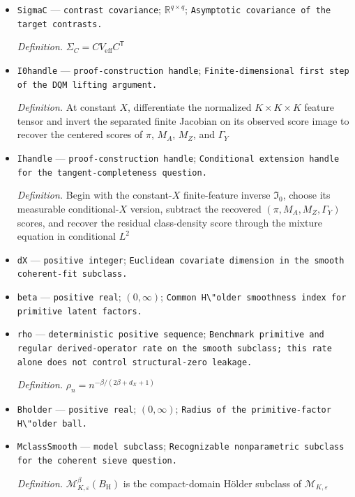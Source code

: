 \documentclass{article}
\begin{document}
\begin{itemize}
  \item \texttt{SigmaC} --- \texttt{contrast covariance}; \(\mathbb R^{q\times q}\); \texttt{Asymptotic covariance of the target contrasts.}
  \par\smallskip\noindent\emph{Definition.} \(\Sigma_C=CV_{\mathrm{eff}}C^{\mathsf T}\)
  \item \texttt{I0handle} --- \texttt{proof-\allowbreak{}construction handle}; \texttt{Finite-\allowbreak{}dimensional first step of the DQM lifting argument.}
  \par\smallskip\noindent\emph{Definition.} At constant \(X\), differentiate the normalized \(K\times K\times K\) feature tensor and invert the separated finite Jacobian on its observed score image to recover the centered scores of \(\pi\), \(M_A\), \(M_Z\), and \(\Gamma_Y\)
  \item \texttt{Ihandle} --- \texttt{proof-\allowbreak{}construction handle}; \texttt{Conditional extension handle for the tangent-\allowbreak{}completeness question.}
  \par\smallskip\noindent\emph{Definition.} Begin with the constant-\(X\) finite-feature inverse \(\mathfrak I_0\), choose its measurable conditional-\(X\) version, subtract the recovered \((\pi,M_A,M_Z,\Gamma_Y)\) scores, and recover the residual class-density score through the mixture equation in conditional \(L^{2}\)
  \item \texttt{dX} --- \texttt{positive integer}; \texttt{Euclidean covariate dimension in the smooth coherent-\allowbreak{}fit subclass.}
  \item \texttt{beta} --- \texttt{positive real}; \((0,\infty)\); \texttt{Common H\textbackslash{}\allowbreak{}"older smoothness index for primitive latent factors.}
  \item \texttt{rho} --- \texttt{deterministic positive sequence}; \texttt{Benchmark primitive and regular derived-\allowbreak{}operator rate on the smooth subclass;\allowbreak{} this rate alone does not control structural-\allowbreak{}zero leakage.}
  \par\smallskip\noindent\emph{Definition.} \(\rho_n=n^{-\beta/(2\beta+d_X+1)}\)
  \item \texttt{Bholder} --- \texttt{positive real}; \((0,\infty)\); \texttt{Radius of the primitive-\allowbreak{}factor H\textbackslash{}\allowbreak{}"older ball.}
  \item \texttt{MclassSmooth} --- \texttt{model subclass}; \texttt{Recognizable nonparametric subclass for the coherent sieve question.}
  \par\smallskip\noindent\emph{Definition.} \(\mathcal M^{\beta}_{K,\varepsilon}(B_{\mathrm H})\) is the compact-domain H\"older subclass of \(\mathcal M_{K,\varepsilon}\)

\end{itemize}
\end{document}
